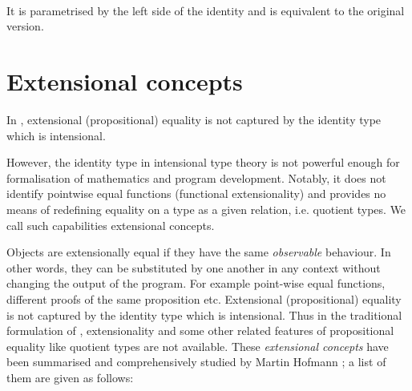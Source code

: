 \begin{itemize}
\begin{code}
\\
\>  \AgdaSymbol{\{} \AgdaSymbol{:} \AgdaSymbol{\}} \AgdaSymbol{(} \AgdaSymbol{:} \AgdaSymbol{)} \AgdaSymbol{:}    \<%
\\
\>[0]\<[2]%
\>[2] \AgdaSymbol{:}   \<%
\\
\end{code}
It is parametrised by the left side of the identity and is equivalent to the original version.
\end{itemize}



\section{Extensional concepts}
\label{extensionality}



In \itt, extensional (propositional) equality is not captured by the identity type which is intensional.

However, the identity type in intensional type theory is not powerful enough for formalisation of mathematics and program development. Notably, it does not identify pointwise equal functions (functional extensionality) and provides no means of redefining equality on a type as a given relation, i.e. quotient types. We call such capabilities extensional concepts.



Objects are extensionally equal if they have the same \emph{observable} behaviour. In other words, they can be substituted by one another in any context without changing the output of the program. For example point-wise equal functions, different proofs of the same proposition etc. Extensional (propositional) equality is not captured by the identity type which is intensional.
Thus in the traditional formulation of \itt, extensionality and some other related features of propositional equality like quotient types are not available. These \emph{extensional concepts} have been summarised and comprehensively studied by Martin Hofmann \cite{hof:phd}; a list of them are given as follows:



